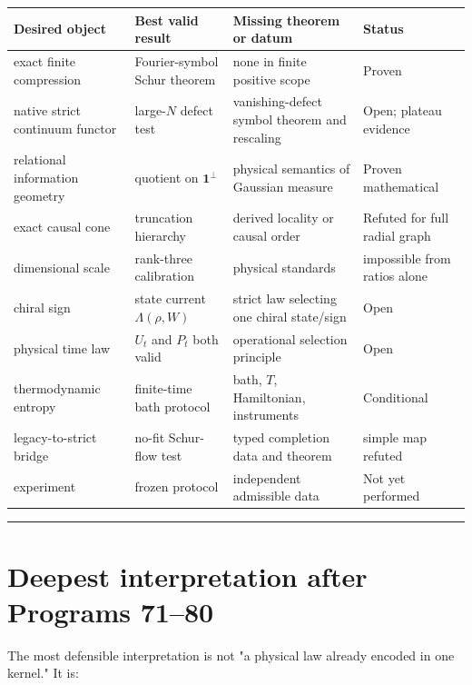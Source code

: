 \documentclass[11pt,a4paper,openany]{report}
\begin{document}
\begin{center}
\begingroup\small
\setlength{\tabcolsep}{3.5pt}
\renewcommand{\arraystretch}{1.16}
\begin{longtable}{@{}p{}p{}p{}p{}@{}}
\toprule
\textbf{Desired object} & \textbf{Best valid result} & \textbf{Missing theorem or datum} & \textbf{Status} \\
\midrule
\endhead
exact finite compression & Fourier-symbol Schur theorem & none in finite positive scope & Proven \\
native strict continuum functor & large-\(N\) defect test & vanishing-defect symbol theorem and rescaling & Open; plateau evidence \\
relational information geometry & quotient on \(\mathbf1^\perp\) & physical semantics of Gaussian measure & Proven mathematical \\
exact causal cone & truncation hierarchy & derived locality or causal order & Refuted for full radial graph \\
dimensional scale & rank-three calibration & physical standards & impossible from ratios alone \\
chiral sign & state current \(\Lambda(\rho,W)\) & strict law selecting one chiral state/\allowbreak{}sign & Open \\
physical time law & \(U_t\) and \(P_t\) both valid & operational selection principle & Open \\
thermodynamic entropy & finite-time bath protocol & bath, \(T\), Hamiltonian, instruments & Conditional \\
legacy-to-strict bridge & no-fit Schur-flow test & typed completion data and theorem & simple map refuted \\
experiment & frozen protocol & independent admissible data & Not yet performed \\
\bottomrule
\end{longtable}
\endgroup
\end{center}

\par\medskip\hrule\medskip

\chapter{Deepest interpretation after Programs 71--80}

The most defensible interpretation is not "a physical law already encoded in one kernel." It is:
\end{document}
